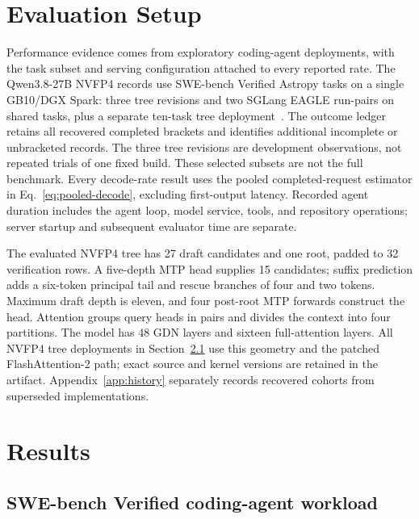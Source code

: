 \documentclass[conference]{IEEEtran}
\begin{document}
\section{Evaluation Setup}
\label{sec:protocol}
Performance evidence comes from exploratory coding-agent deployments, with the task subset and serving configuration attached to every reported rate. The Qwen3.8-27B NVFP4 records use SWE-bench Verified Astropy tasks on a single GB10/DGX Spark: three tree revisions and two SGLang EAGLE run-pairs on shared tasks, plus a separate ten-task tree deployment~\cite{lumo2026archive,jimenez2024swe}. The outcome ledger retains all recovered completed brackets and identifies additional incomplete or unbracketed records. The three tree revisions are development observations, not repeated trials of one fixed build. These selected subsets are not the full benchmark. Every decode-rate result uses the pooled completed-request estimator in Eq.~\ref{eq:pooled-decode}, excluding first-output latency. Recorded agent duration includes the agent loop, model service, tools, and repository operations; server startup and subsequent evaluator time are separate.

The evaluated NVFP4 tree has 27 draft candidates and one root, padded to 32 verification rows. A five-depth MTP head supplies 15 candidates; suffix prediction adds a six-token principal tail and rescue branches of four and two tokens. Maximum draft depth is eleven, and four post-root MTP forwards construct the head. Attention groups query heads in pairs and divides the context into four partitions. The model has 48 GDN layers and sixteen full-attention layers. All NVFP4 tree deployments in Section~\ref{sec:agent-workload} use this geometry and the patched FlashAttention-2 path; exact source and kernel versions are retained in the artifact. Appendix~\ref{app:history} separately records recovered cohorts from superseded implementations.



\section{Results}
\label{sec:results}
\subsection{SWE-bench Verified coding-agent workload}
\label{sec:agent-workload}

\end{document}
